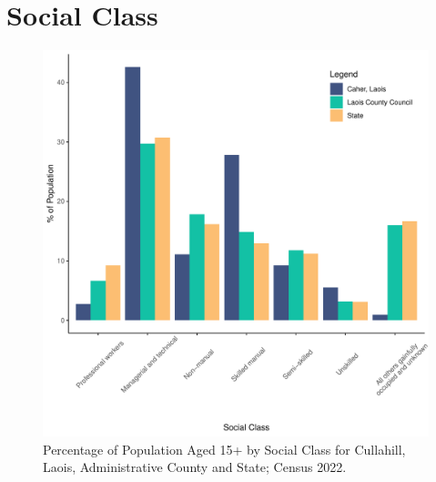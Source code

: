 \documentclass{article}
\begin{document}
\section{Social Class}\label{sect:SC}
\begin{figure}[H]
	\centering
	\includegraphics[width = 140mm]{../figures/SocialClassED.pdf}
	\caption{Percentage of Population Aged 15+ by Social Class for Cullahill, Laois, Administrative County and State; Census 2022.}
	\label{fig:vbnv}
	\end{figure}
\end{document}
